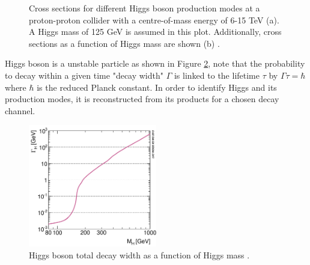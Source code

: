 \begin{figure}[htbp]
    \centering
    \caption{Cross sections for different Higgs boson production modes at a proton-proton collider with a centre-of-mass energy of 6-15 TeV (a). A Higgs mass of 125 GeV is assumed in this plot. Additionally, cross sections as a function of Higgs mass are shown (b) \cite{LHCHXSWG_Twiki}.}
    \label{fig:chap1:EWSB:HXSEC}
\end{figure}
Higgs boson is a unstable particle as shown in Figure \ref{fig:chap1:EWSB:D}, note that the probability to decay within a given time "decay width" $\Gamma$ is linked to the lifetime $\tau$ by $ \Gamma\tau = \hbar$ where $\hbar$ is the reduced Planck constant. In order to identify Higgs and its production modes, it is reconstructed from its products for a chosen decay channel. 
\begin{figure}[htbp]
    \centering
    \includegraphics[width=0.5\textwidth]{Ch1/Img/Higgs_decay.png}
    \caption{Higgs boson total decay width as a function of Higgs mass \cite{HiggsWidth}.}
    \label{fig:chap1:EWSB:D}
\end{figure}

